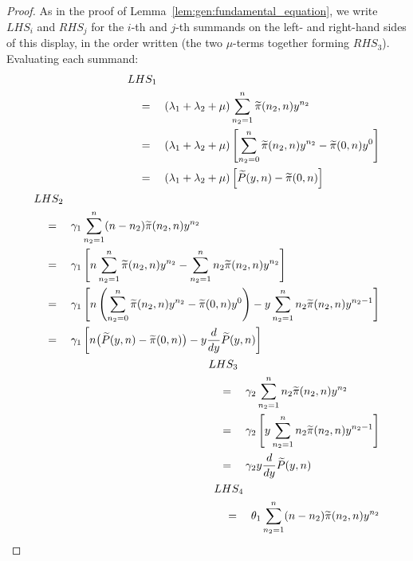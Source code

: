 \begin{proof}
    As in the proof of Lemma~\ref{lem:gen:fundamental_equation}, we write $LHS_i$ and $RHS_j$ for the $i$-th and $j$-th summands on the left- and right-hand sides of this display, in the order written (the two $\mu$-terms together forming $RHS_3$). Evaluating each summand:
    \begin{align*}
        \begin{split}
            & LHS_1 \\
            & \quad = \quad (\lambda_1 + \lambda_2 + \mu) \sum_{n_2=1}^{n} \tpi(n_2,n) y^{n_2} \\
            & \quad = \quad (\lambda_1 + \lambda_2 + \mu) \left[ \sum_{n_2=0}^{n} \tpi(n_2,n) y^{n_2} - \tpi(0,n) y^0 \right] \\
            & \quad = \quad (\lambda_1 + \lambda_2 + \mu) \left[ \widetilde{P}(y,n) - \tpi(0,n) \right]
        \end{split} \\
        \begin{split}
            & LHS_2 \\
            & \quad = \quad \gamma_1 \sum_{n_2=1}^{n} (n-n_2) \tpi(n_2,n) y^{n_2} \\
            & \quad = \quad \gamma_1 \left[ n \sum_{n_2=1}^{n} \tpi(n_2,n) y^{n_2} - \sum_{n_2=1}^{n} n_2 \tpi(n_2,n) y^{n_2} \right] \\
            & \quad = \quad \gamma_1 \left[ n \left( \sum_{n_2=0}^{n} \tpi(n_2,n) y^{n_2} - \tpi(0,n) y^0 \right) - y \sum_{n_2=1}^{n} n_2 \tpi(n_2,n) y^{n_2-1} \right] \\
            & \quad = \quad \gamma_1 \left[ n \big( \widetilde{P}(y,n) - \tpi(0,n) \big) - y \frac{d}{dy} \widetilde{P}(y,n) \right]
        \end{split} \\
        \begin{split}
            & LHS_3 \\
            & \quad = \quad \gamma_2 \sum_{n_2=1}^{n} n_2 \tpi(n_2,n) y^{n_2} \\
            & \quad = \quad \gamma_2 \left[ y \sum_{n_2=1}^{n} n_2 \tpi(n_2,n) y^{n_2-1} \right] \\
            & \quad = \quad \gamma_2 y \frac{d}{dy} \widetilde{P}(y,n)
        \end{split} \\
        \begin{split}
            & LHS_4 \\
            & \quad = \quad \theta_1 \sum_{n_2=1}^{n} (n-n_2) \tpi(n_2,n) y^{n_2} \\

\end{split}
\end{align*}
\end{proof}
